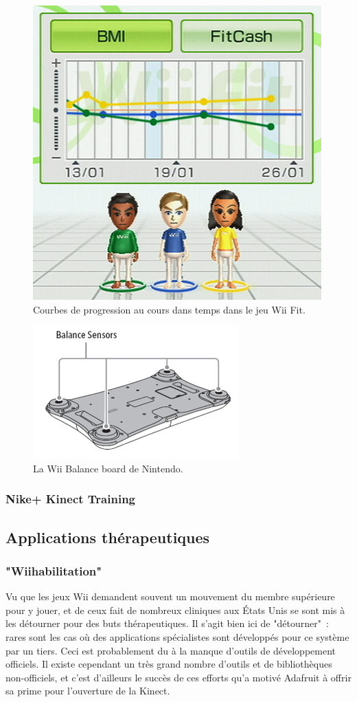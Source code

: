 \begin{figure}[h!]
\centering
\includegraphics[width=0.5\linewidth]{images/wii_fit}
\caption{Courbes de progression au cours dans temps dans le jeu Wii Fit.}
\label{fig:wii_fit}
\end{figure}

\begin{figure}[h!]
\centering
\includegraphics[width=0.5\linewidth]{images/balance_board}
\caption{La Wii Balance board de Nintendo.}
\label{fig:balance_board}
\end{figure}


\subsubsection{Nike+ Kinect Training}



\subsection{Applications thérapeutiques}

\subsubsection{"Wiihabilitation"}

Vu que les jeux Wii demandent souvent un mouvement du membre supérieure pour y 
jouer, et de ceux fait de nombreux 
cliniques aux États Unis se sont mis à les détourner pour des buts 
thérapeutiques. Il s'agit bien ici de "détourner"~: rares sont les cas où des
applications spécialistes sont développés pour ce système par un tiers. Ceci
est probablement du à la manque d'outils de développement officiels. Il existe
cependant un très grand nombre d'outils et de bibliothèques non-officiels, et
c'est d'ailleurs le succès de ces efforts qu'a motivé Adafruit à offrir sa prime
pour l'ouverture de la Kinect.



